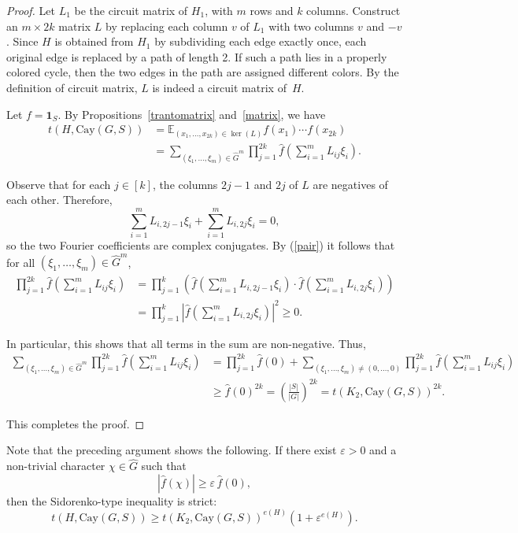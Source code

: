 \documentclass[12pt,a4paper]{article}
\theoremstyle{definition}
\theoremstyle{plain}
\theoremstyle{definition}
\begin{document}
\begin{proof}
Let $L_1$ be the circuit matrix of $H_1$, with $m$ rows and $k$ columns. Construct an $m \times 2k$ matrix $L$ by replacing each column $v$ of $L_1$ with two columns $v$ and $-v$. Since $H$ is obtained from $H_1$ by subdividing each edge exactly once, each original edge is replaced by a path of length 2. If such a path lies in a properly colored cycle, then the two edges in the path are assigned different colors. By the definition of circuit matrix, $L$ is indeed a circuit matrix of~$H$.

Let $f=\mathbf{1}_S$. By Propositions~\ref{trantomatrix} and~\ref{matrix}, we have
\[
\begin{aligned}
    t(H,\mathrm{Cay}(G, S)) &= \mathbb{E}_{(x_1, \dots, x_{2k}) \in \ker(L)} f(x_1) \cdots f(x_{2k}) \\
    &= \sum_{(\xi_1, \dots, \xi_m) \in \widehat{G}^m} \prod_{j=1}^{2k} \widehat{f} \left( \sum_{i=1}^m L_{ij} \xi_i \right).
\end{aligned}
\]

Observe that for each $j \in [k]$, the columns $2j - 1$ and $2j$ of $L$ are negatives of each other. Therefore,
\[
\sum_{i=1}^m L_{i, 2j-1} \xi_i + \sum_{i=1}^m L_{i, 2j} \xi_i = 0,
\]
so the two Fourier coefficients are complex conjugates. By (\ref{pair}) it follows that for all $(\xi_1, \dots, \xi_m) \in \widehat{G}^m$,
\[
\begin{aligned}
\prod_{j=1}^{2k} \widehat{f} \left( \sum_{i=1}^m L_{ij} \xi_i \right)
&= \prod_{j=1}^{k} \left( \widehat{f} \left( \sum_{i=1}^m L_{i, 2j-1} \xi_i \right) \cdot \widehat{f} \left( \sum_{i=1}^m L_{i, 2j} \xi_i \right) \right) \\
&= \prod_{j=1}^{k} \left| \widehat{f} \left( \sum_{i=1}^m L_{i, 2j} \xi_i \right) \right|^2 \geq 0.
\end{aligned}
\]

In particular, this shows that all terms in the sum are non-negative. Thus,
\[
\begin{aligned}
\sum_{(\xi_1, \dots, \xi_m) \in \widehat{G}^m} \prod_{j=1}^{2k} \widehat{f} \left( \sum_{i=1}^m L_{ij} \xi_i \right)
&= \prod_{j=1}^{2k} \widehat{f}(0) + \sum_{(\xi_1, \dots, \xi_m) \neq (0, \dots, 0)} \prod_{j=1}^{2k} \widehat{f} \left( \sum_{i=1}^m L_{ij} \xi_i \right) \\
&\geq \widehat{f}(0)^{2k} = \left( \frac{|S|}{|G|} \right)^{2k} = t(K_2,\mathrm{Cay}(G, S))^{2k}.
\end{aligned}
\]

This completes the proof.
\end{proof}
Note that the preceding argument shows the following.  
If there exist $\varepsilon>0$ and a non-trivial character $\chi\in\widehat{G}$ such that
\[
   |\widehat{f}(\chi)| \ge \varepsilon\,\widehat{f}(0),
\]
then the Sidorenko-type inequality is strict:
\[
   t(H, \mathrm{Cay}(G, S))
   \ge
   t(K_2, \mathrm{Cay}(G, S))^{e(H)}
   (1 + \varepsilon^{e(H)}).
\]
\end{document}
